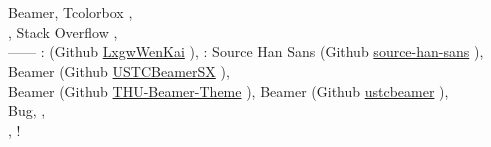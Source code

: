 \documentclass{article}
\begin{document}


\section{ }
\subsection{ }
\begin{frame}[allowframebreaks]{ }
	\nocite{*}
	\printbibliography[heading=none]
\end{frame}

\section{ }
\subsection{ }
\begin{frame}{ }
	\begin{center}
		 Beamer, Tcolorbox ,  \\[1ex]
		 , Stack Overflow ,  \\[1ex]
		 ------ :  (Github \href{https://github.com/lxgw/LxgwWenKai/}{\color{BSblue}LxgwWenKai}  ),  : Source Han Sans (Github \href{https://github.com/adobe-fonts/source-han-sans/}{\color{BSblue}source-han-sans}  ),  \\[1ex]
		 Beamer (Github \href{https://github.com/ysx2000/USTCBeamerSX/}{\color{BSblue}USTCBeamerSX}  ),  \\[1ex]
		 Beamer (Github \href{https://github.com/tuna/THU-Beamer-Theme/}{\color{BSblue}THU-Beamer-Theme}  ),  Beamer (Github \href{https://github.com/ustctug/ustcbeamer/}{\color{BSblue}ustcbeamer}  ),  \\[1ex]
		
		 Bug,  ,  \\[1ex]
		 ,  !
	\end{center}
\end{frame}

\begin{frame}{~}
	\centering
	\Huge  
\end{frame}
\end{document}
